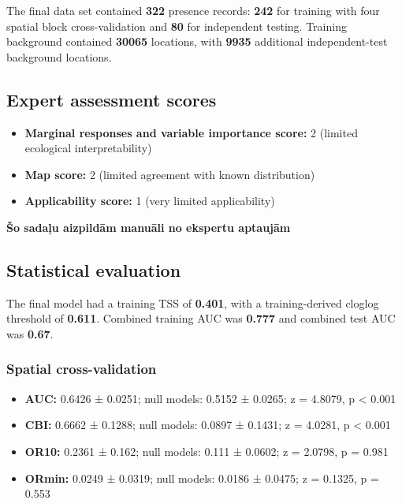 \documentclass[
  openany]{book}
\providecommand{\tightlist}{%
  \setlength{\itemsep}{0pt}\setlength{\parskip}{0pt}}
\providecommand{\tightlist}{%
  \setlength{\itemsep}{0pt}%
  \setlength{\parskip}{0pt}%
}
\begin{document}
The final data set contained \textbf{322} presence records: \textbf{242} for training with four spatial block cross-validation and \textbf{80} for independent testing. Training background contained \textbf{30065} locations, with \textbf{9935} additional independent-test background locations.

\subsection*{Expert assessment scores}\label{expert-assessment-scores-16}

\begin{itemize}
\tightlist
\item
  \textbf{Marginal responses and variable importance score:} 2 (limited ecological interpretability)
\item
  \textbf{Map score:} 2 (limited agreement with known distribution)
\item
  \textbf{Applicability score:} 1 (very limited applicability)
\end{itemize}

\textbf{Šo sadaļu aizpildām manuāli no ekspertu aptaujām}

\subsection*{Statistical evaluation}\label{statistical-evaluation-16}

The final model had a training TSS of \textbf{0.401}, with a training-derived cloglog threshold of \textbf{0.611}. Combined training AUC was \textbf{0.777} and combined test AUC was \textbf{0.67}.

\subsubsection*{Spatial cross-validation}\label{spatial-cross-validation-16}

\begin{itemize}
\tightlist
\item
  \textbf{AUC:} 0.6426 ± 0.0251; null models: 0.5152 ± 0.0265; z = 4.8079, p \textless{} 0.001
\item
  \textbf{CBI:} 0.6662 ± 0.1288; null models: 0.0897 ± 0.1431; z = 4.0281, p \textless{} 0.001
\item
  \textbf{OR10:} 0.2361 ± 0.162; null models: 0.111 ± 0.0602; z = 2.0798, p = 0.981
\item
  \textbf{ORmin:} 0.0249 ± 0.0319; null models: 0.0186 ± 0.0475; z = 0.1325, p = 0.553
\end{itemize}
\end{document}
